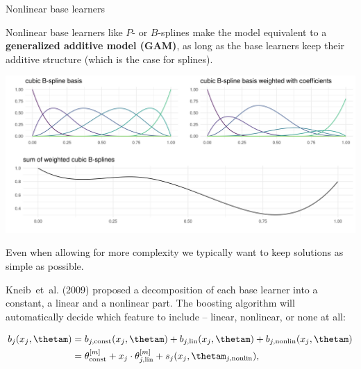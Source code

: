 
\begin{vbframe}{Nonlinear base learners}

Nonlinear base learners like $P$- or $B$-splines make the model equivalent to a
\textbf{generalized additive model (GAM)}, as long as the base learners keep 
their additive structure (which is the case for splines).
\vspace{0.5cm}

\vfill

\begin{center}
\includegraphics[width=1\textwidth]{figure/bspline-basis.png}
\end{center}

% 

\framebreak


Even when allowing for more complexity we typically want to keep solutions as 
simple as possible.

\lz

Kneib~et~al. (2009) proposed a decomposition of each base learner into a 
constant, a linear and a nonlinear part. 
The boosting algorithm will automatically decide which feature to include -- 
linear, nonlinear, or none at all:

\vspace{-0.5cm}

\begin{align*}
b_j(x_j, \thetam) & = b_{j, \text{const}}(x_j, \thetam) + b_{j, \text{lin}}
(x_j, \thetam) + b_{j, \text{nonlin}}(x_j, \thetam)\\
 & = \theta^{[m]}_\text{const} + x_j \cdot \theta^{[m]}_{j, \text{lin}} + 
 s_j(x_j, \thetam_{j,\text{nonlin}}),
\end{align*}


\end{vbframe}
